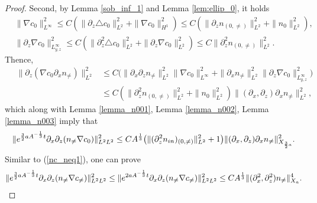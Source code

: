\documentclass[12pt, reqno]{amsart}
\numberwithin{equation}{section}
\begin{document}
\begin{proof}
		Second, by Lemma \ref{sob_inf_1} and Lemma \ref{lem:ellip_0}, it holds 
		\begin{equation*}
			\begin{aligned}
				&\|\nabla c_{0}\|^2_{L^{\infty}}
				\leq C(\|\partial_z\triangle c_{0}\|^2_{L^{2}}+\|\nabla c_{0}\|^2_{H^{1}})
				\leq C(\|\partial_zn_{(0,\neq)}\|^2_{L^{2}}
				+\|n_{0}\|^2_{L^{2}}),\\
				&\|\partial_z\nabla c_{0}\|^2_{L^{\infty}_{y,z}}
				\leq C(\|\partial_z^2\triangle c_{0}\|^2_{L^{2}}+
				\|\partial_z\nabla c_{0}\|^2_{L^{2}})
				\leq C\|\partial_z^2n_{(0,\neq)}\|^2_{L^{2}}.
			\end{aligned}
		\end{equation*}
		Thence,  
		\begin{equation*}
			\begin{aligned}
				\quad\|\partial_z(\nabla c_{0}\partial_xn_{\neq})\|^2_{L^2}
				&\leq C\big(
				\|\partial_x\partial_zn_{\neq}\|^2_{L^2}
				\|\nabla c_{0}\|^2_{L^{\infty}}
				+\|\partial_xn_{\neq}\|^2_{L^2}
				\|\partial_z\nabla c_{0}\|^2_{L^{\infty}_{y,z}}
				\big)\\
				&\leq C(\|\partial_z^2n_{(0,\neq)}\|^2_{L^2}+
				\|n_{0}\|^2_{L^2})
				\|(\partial_x,\partial_z)\partial_xn_{\neq}\|^2_{L^{2}},
			\end{aligned}
		\end{equation*}
		which along with Lemma \ref{lemma_n001},  Lemma \ref{lemma_n002},  Lemma \ref{lemma_n003} imply that 
		\begin{equation*}
			\begin{aligned}
				\|{\rm e}^{\frac32aA^{-\frac{1}{3}}t}
				\partial_x\partial_z(n_{\neq}\nabla c_{0})\|^2_{L^2L^2}\leq 
				CA^{\frac13}\big(\|(\partial_z^2n_{\rm in})_{(0,\neq)}\|_{L^2}^2
				+1\big)
				\|(\partial_x,\partial_z)\partial_xn_{\neq}\|^2_{X_{\frac32a}}.
			\end{aligned}
		\end{equation*}
		Similar to (\ref{nc_neq1}),
		one can prove 
		\begin{equation*}
			\begin{aligned}
				\|{\rm e}^{\frac32aA^{-\frac{1}{3}}t}
				\partial_x\partial_z(n_{\neq}\nabla c_{\neq})\|^2_{L^2L^2}\leq 
				\|{\rm e}^{2aA^{-\frac{1}{3}}t}
				\partial_x\partial_z(n_{\neq}\nabla c_{\neq})\|^2_{L^2L^2}
				\leq CA^{\frac13}
				\|(\partial_x^2,\partial_z^2)n_{\neq}\|^4_{X_a}.
			\end{aligned}
		\end{equation*}
		

\end{proof}
\end{document}
